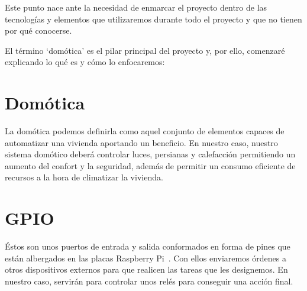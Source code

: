 
\label{cap:Conceptos teóricos}

Este punto nace ante la necesidad de enmarcar el proyecto dentro de las tecnologías y elementos que utilizaremos durante todo el proyecto y que no tienen por qué conocerse.

El término ‘domótica’ es el pilar principal del proyecto y, por ello, comenzaré explicando lo qué es y cómo lo enfocaremos:

\section{Domótica}\label{concepto:Domótica}
La domótica podemos definirla como aquel conjunto de elementos capaces de automatizar una vivienda aportando un beneficio.
En nuestro caso, nuestro sistema domótico deberá controlar luces, persianas y calefacción permitiendo un aumento del confort y la seguridad, además de permitir un consumo eficiente de recursos a la hora de climatizar la vivienda.

\begin{displayquote}
 \cite{inproceedings:CitaDomotica}
\end{displayquote}

\section{GPIO}\label{concepto:GPIO}
Éstos son unos puertos de entrada y salida conformados en forma de pines que están albergados en las placas Raspberry Pi~\cite{misc:RbPWeb}. Con ellos enviaremos órdenes a otros dispositivos externos para que realicen las tareas que les designemos. En nuestro caso, servirán para controlar unos relés para conseguir una acción final.

